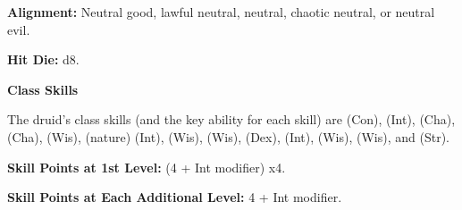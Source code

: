 
\textbf{Alignment:} Neutral good, lawful neutral, neutral, chaotic neutral, or neutral evil.

\textbf{Hit Die:} d8.

\textbf{Class Skills}

The druid's class skills (and the key ability for each skill) are  
(Con),  (Int),  (Cha),  (Cha),  (Wis),  
(nature) (Int),  (Wis),  (Wis),  (Dex),  (Int),  
(Wis),  (Wis), and  (Str). 

\textbf{Skill Points at 1st Level:} (4 + Int modifier) x4.

\textbf{Skill Points at Each Additional Level: }4 + Int modifier.

